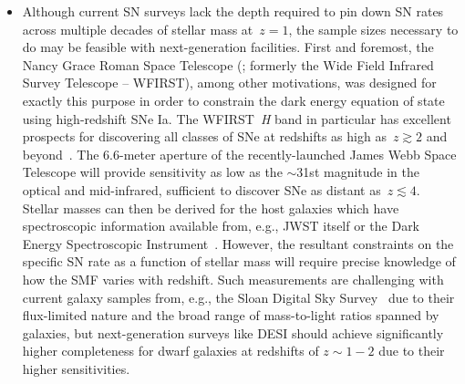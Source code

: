 \documentclass[ms.tex]{subfiles}
\begin{document}
\begin{itemize}
	\item Although current SN surveys lack the depth required to pin down SN
	rates across multiple decades of stellar mass at~$z = 1$, the sample sizes
	necessary to do may be feasible with next-generation facilities.
	First and foremost, the Nancy Grace Roman Space Telescope
	(\citealp{Spergel2013, Spergel2015}; formerly the Wide Field Infrared
	Survey Telescope -- WFIRST), among other motivations, was designed for
	exactly this purpose in order to constrain the dark energy equation of
	state using high-redshift SNe Ia.
	The WFIRST~\textit{H} band in particular has excellent prospects for
	discovering all classes of SNe at redshifts as high as~$z \gtrsim 2$ and
	beyond~\citep{Petrushevska2016}.
	The 6.6-meter aperture of the recently-launched James Webb Space Telescope
	\citep[JWST;][]{Gardner2006} will provide sensitivity as low as the
	$\sim$31st magnitude in the optical and mid-infrared, sufficient to
	discover SNe as distant as~$z \lesssim 4$.
	Stellar masses can then be derived for the host galaxies which have
	spectroscopic information available from, e.g., JWST itself or the Dark
	Energy Spectroscopic Instrument~\citep[DESI;][]{DESI2016}.
	However, the resultant constraints on the specific SN rate as a function of
	stellar mass will require precise knowledge of how the SMF varies with
	redshift.
	Such measurements are challenging with current galaxy samples from, e.g.,
	the Sloan Digital Sky Survey~\citep[SDSS;][]{York2000, Abdorrouf2022} due
	to their flux-limited nature and the broad range of mass-to-light ratios
	spanned by galaxies, but next-generation surveys like DESI should achieve
	significantly higher completeness for dwarf galaxies at redshifts of
	$z \sim 1 - 2$ due to their higher sensitivities.


\end{itemize}
\end{document}

